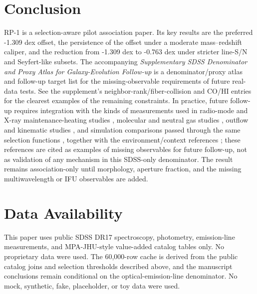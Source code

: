 \documentclass[twocolumn]{aastex631}
\begin{document}
\section{Conclusion}
RP-1 is a selection-aware pilot association paper. Its key results are the preferred -1.309 dex offset, the persistence of the offset under a moderate mass--redshift caliper, and the reduction from -1.309 dex to -0.763 dex under stricter line-S/N and Seyfert-like subsets. The accompanying \emph{Supplementary SDSS Denominator and Proxy Atlas for Galaxy-Evolution Follow-up} is a denominator/proxy atlas and follow-up target list for the missing-observable requirements of future real-data tests. See the supplement's neighbor-rank/fiber-collision and CO/HI entries for the clearest examples of the remaining constraints.
In practice, future follow-up requires integration with the kinds of measurements used in radio-mode and X-ray maintenance-heating studies \citep{best2005,fabian2012,mcnamara2007,heckmanbest2014,lamassa2013}, molecular and neutral gas studies \citep{xcoldgass2017,xgass2018}, outflow and kinematic studies \citep{veilleux2005,cicone2014,carniani2017,fiore2017}, and simulation comparisons passed through the same selection functions \citep{simba2019,tng2019,eagle2015}, together with the environment/context references \citep{peng2010,ellison2011,piotrowska2022,wetzel2013,dekel2006}; these references are cited as examples of missing observables for future follow-up, not as validation of any mechanism in this SDSS-only denominator. The result remains association-only until morphology, aperture fraction, and the missing multiwavelength or IFU observables are added.

\section*{Data Availability}
This paper uses public SDSS DR17 spectroscopy, photometry, emission-line measurements, and MPA-JHU-style value-added catalog tables only. No proprietary data were used. The 60,000-row cache is derived from the public catalog joins and selection thresholds described above, and the manuscript conclusions remain conditional on the optical-emission-line denominator. No mock, synthetic, fake, placeholder, or toy data were used.

\end{document}
